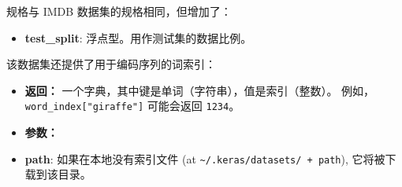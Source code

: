 \begin{Shaded}
\begin{Highlighting}[]
  

\OperatorTok{=} \OperatorTok{=}\NormalTok{,}
                                                         \OperatorTok{=}\NormalTok{,}
                                                         \OperatorTok{=}\NormalTok{,}
                                                         \OperatorTok{=}\NormalTok{,}
                                                         \OperatorTok{=}\NormalTok{,}
                                                         \OperatorTok{=}\NormalTok{,}
                                                         \OperatorTok{=}\NormalTok{,}
                                                         \OperatorTok{=}\NormalTok{,}
                                                         \OperatorTok{=}\NormalTok{)}
\end{Highlighting}
\end{Shaded}

规格与 IMDB 数据集的规格相同，但增加了：

\begin{itemize}
\tightlist
\item
  \textbf{test\_split}: 浮点型。用作测试集的数据比例。
\end{itemize}

该数据集还提供了用于编码序列的词索引：

\begin{Shaded}
\begin{Highlighting}[]
\OperatorTok{=} \OperatorTok{=}\NormalTok{)}
\end{Highlighting}
\end{Shaded}

\begin{itemize}
\item
  \textbf{返回：} 一个字典，其中键是单词（字符串），值是索引（整数）。
  例如，\texttt{word\_index{[}"giraffe"{]}} 可能会返回 \texttt{1234}。
\item
  \textbf{参数：}
\item
  \textbf{path}: 如果在本地没有索引文件 (at
  \texttt{\textquotesingle{}\textasciitilde{}/.keras/datasets/\textquotesingle{}\ +\ path}),
  它将被下载到该目录。
\end{itemize}


